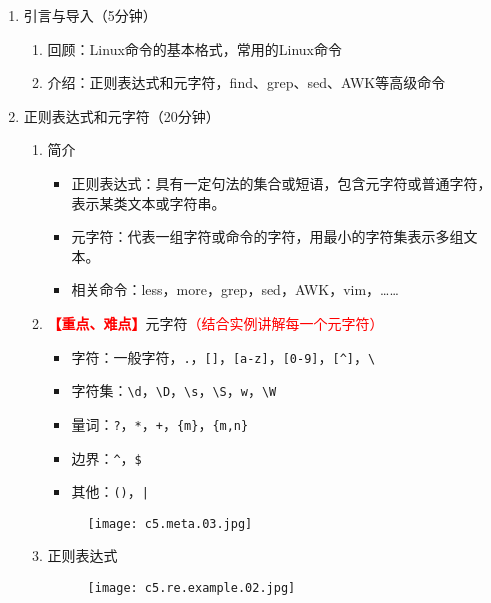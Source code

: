 \documentclass{TIJMUjiaoanLL}
\begin{document}
\firstTail


\newpage
\otherHeader

\begin{enumerate}
  \item 引言与导入（5分钟）
    \begin{enumerate}
      \item 回顾：Linux命令的基本格式，常用的Linux命令
      \item 介绍：正则表达式和元字符，find、grep、sed、AWK等高级命令
    \end{enumerate}

  \item 正则表达式和元字符（20分钟）
    \begin{enumerate}
      \item 简介
	\begin{itemize}
	  \item 正则表达式：具有一定句法的集合或短语，包含元字符或普通字符，表示某类文本或字符串。
	  \item 元字符：代表一组字符或命令的字符，用最小的字符集表示多组文本。
	  \item 相关命令：less，more，grep，sed，AWK，vim，……
	\end{itemize}
      \item \textcolor{red}{\textbf{【重点、难点】}}元字符\textcolor{red}{（结合实例讲解每一个元字符）}
	\begin{itemize}
	  \item 字符：一般字符，\verb|.|，\verb|[]|，\verb|[a-z]|，\verb|[0-9]|，\verb|[^]|，\verb|\|
	  \item 字符集：\verb|\d|，\verb|\D|，\verb|\s|，\verb|\S|，\verb|w|，\verb|\W|
	  \item 量词：\verb|?|，\verb|*|，\verb|+|，\verb|{m}|，\verb|{m,n}|
	  \item 边界：\verb|^|，\verb|$|
	  \item 其他：\verb|()|，\verb=|=
	\end{itemize}
	\vspace*{-10pt}
	\begin{figure}[h]
	  \centering
	  \texttt{[image: c5.meta.03.jpg]}
	\end{figure}
	\vspace*{-10pt}
      \item 正则表达式
	\vspace*{-10pt}
	\begin{figure}[h]
	  \centering
	  \texttt{[image: c5.re.example.02.jpg]}
	\end{figure}
	\vspace*{-10pt}
    \end{enumerate}



\end{enumerate}
\end{document}

